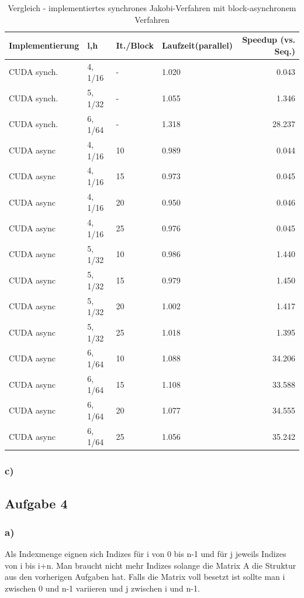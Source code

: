 \documentclass{report}
\begin{document}
\begin{table}
	\begin{tabular}{|l|l|l|l|r|}
		\hline
		Implementierung & l,h & It./Block & Laufzeit(parallel) & Speedup (vs. Seq.)\\

		\hline
		CUDA synch. & 4, 1/16 & - & 1.020 & 0.043 \\
		\hline
		CUDA synch. & 5, 1/32 & - & 1.055 & 1.346 \\
		\hline
		CUDA synch. & 6, 1/64 & - & 1.318 & 28.237 \\
		\hline
		CUDA async & 4, 1/16 & 10 & 0.989 & 0.044 \\
		\hline
		CUDA async & 4, 1/16 & 15 & 0.973 & 0.045 \\
		\hline
		CUDA async & 4, 1/16 & 20 & 0.950 & 0.046 \\
		\hline
		CUDA async & 4, 1/16 & 25 & 0.976 & 0.045 \\
		\hline
		CUDA async & 5, 1/32 & 10 & 0.986 & 1.440 \\
		\hline
		CUDA async & 5, 1/32 & 15 & 0.979 & 1.450 \\
		\hline
		CUDA async & 5, 1/32 & 20 & 1.002 & 1.417 \\
		\hline
		CUDA async & 5, 1/32 & 25 & 1.018 & 1.395 \\
		\hline
		CUDA async & 6, 1/64 & 10 & 1.088 & 34.206 \\
		\hline
		CUDA async & 6, 1/64 & 15 & 1.108 & 33.588 \\
		\hline
		CUDA async & 6, 1/64 & 20 & 1.077 & 34.555 \\
		\hline
		CUDA async & 6, 1/64 & 25 & 1.056 & 35.242 \\

		\hline 
	\end{tabular}
	\caption{Vergleich -  implementiertes synchrones Jakobi-Verfahren mit block-asynchronem Verfahren}
	\label{Table:2_3b}
\end{table}

\subsubsection{c)}

\subsection{Aufgabe 4}

\subsubsection{a)}
Als Indexmenge eignen sich Indizes für i von 0 bis n-1 und für j jeweils Indizes von i bis i+n. Man braucht nicht mehr Indizes solange die Matrix A die Struktur aus den vorherigen Aufgaben hat. Falls die Matrix voll besetzt ist sollte man i zwischen 0 und n-1 variieren und j zwischen i und n-1.
\end{document}
